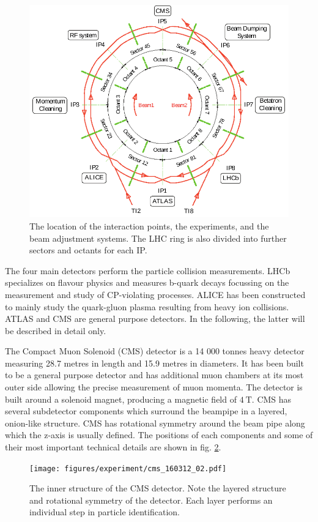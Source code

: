 \begin{figure}[h!]
	\centering
	\includegraphics[width=0.6\linewidth]{figures/experiment/LHC_ring.pdf}
	\caption{The location of the interaction points, the experiments, and the beam adjustment systems. The LHC ring is also divided into further sectors and octants for each IP. \cite{Bracco:1174254}}
	\label{fig:LHC_ring}
\end{figure}

The four main detectors perform the particle collision measurements. LHCb specializes on flavour physics and measures b-quark decays focussing on the measurement and study of CP-violating processes. ALICE has been constructed to mainly study the quark-gluon plasma resulting from heavy ion collisions. ATLAS and CMS are general purpose detectors. In the following, the latter will be described in detail only.


The Compact Muon Solenoid (CMS) detector is a 14 000 tonnes heavy detector measuring 28.7 metres in length and 15.9 metres in diameters. It has been built to be a general purpose detector and has additional muon chambers at its most outer side allowing the precise measurement of muon momenta. The detector is built around a solenoid magnet, producing a magnetic field of $\SI{4}{\tesla}$. CMS has several subdetector components which surround the beampipe in a layered, onion-like structure. CMS has rotational symmetry around the beam pipe along which the z-axis is usually defined. The positions of each components and some of their most important technical details are shown in fig. \ref{fig:cms_view}.

\begin{figure}[h!]
	\centering
	\texttt{[image: figures/experiment/cms\_160312\_02.pdf]}
	\caption{The inner structure of the CMS detector. Note the layered structure and rotational symmetry of the detector. Each layer performs an individual step in particle identification. \cite{Sakuma:2665537}}
	\label{fig:cms_view}
\end{figure}

